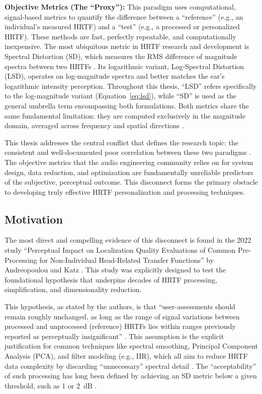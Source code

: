 \documentclass[12pt,a4paper]{article}
\begin{document}
\textbf{Objective Metrics (The ``Proxy''):} This paradigm uses computational, signal-based metrics to quantify the difference between a ``reference'' (e.g., an individual's measured HRTF) and a ``test'' (e.g., a processed or personalized HRTF). These methods are fast, perfectly repeatable, and computationally inexpensive. The most ubiquitous metric in HRTF research and development is Spectral Distortion (SD), which measures the RMS difference of magnitude spectra between two HRTFs \cite{hrtf_measure_review2020}. Its logarithmic variant, Log-Spectral Distortion (LSD), operates on log-magnitude spectra and better matches the ear's logarithmic intensity perception. Throughout this thesis, ``LSD'' refers specifically to the log-magnitude variant (Equation~\ref{eq:lsd}), while ``SD'' is used as the general umbrella term encompassing both formulations. Both metrics share the same fundamental limitation: they are computed exclusively in the magnitude domain, averaged across frequency and spatial directions \cite{hrtf_measure_review2020}.

This thesis addresses the central conflict that defines the research topic: the consistent and well-documented poor correlation between these two paradigms \cite{zhang2025}. The objective metrics that the audio engineering community relies on for system design, data reduction, and optimization are fundamentally unreliable predictors of the subjective, perceptual outcome. This disconnect forms the primary obstacle to developing truly effective HRTF personalization and processing techniques.

\subsection{Motivation}

The most direct and compelling evidence of this disconnect is found in the 2022 study ``Perceptual Impact on Localization Quality Evaluations of Common Pre-Processing for Non-Individual Head-Related Transfer Functions'' by Andreopoulou and Katz \cite{andreopoulou2022}. This study was explicitly designed to test the foundational hypothesis that underpins decades of HRTF processing, simplification, and dimensionality reduction.

This hypothesis, as stated by the authors, is that ``user-assessments should remain roughly unchanged, as long as the range of signal variations between processed and unprocessed (reference) HRTFs lies within ranges previously reported as perceptually insignificant'' \cite{andreopoulou2022}. This assumption is the explicit justification for common techniques like spectral smoothing, Principal Component Analysis (PCA), and filter modeling (e.g., IIR), which all aim to reduce HRTF data complexity by discarding ``unnecessary'' spectral detail \cite{andreopoulou2022}. The ``acceptability'' of such processing has long been defined by achieving an SD metric below a given threshold, such as 1 or 2~dB \cite{andreopoulou2022}.
\end{document}
